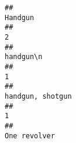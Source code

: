 \documentclass[
]{article}
\begin{document}
\begin{verbatim}
##                                                                                                                                                                                                                                                                                                                                                                                               Handgun 
##                                                                                                                                                                                                                                                                                                                                                                                                     2 
##                                                                                                                                                                                                                                                                                                                                                                                             handgun\n 
##                                                                                                                                                                                                                                                                                                                                                                                                     1 
##                                                                                                                                                                                                                                                                                                                                                                                      handgun, shotgun 
##                                                                                                                                                                                                                                                                                                                                                                                                     1 
##                                                                                                                                                                                                                                                                                                                                                                                          One revolver 

\end{verbatim}
\end{document}
